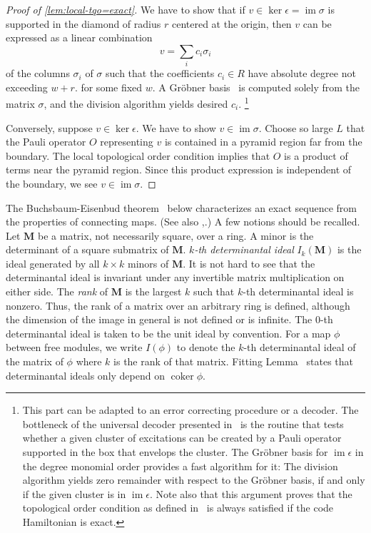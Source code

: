 \documentclass[letterpaper,12pt]{amsart}
\theoremstyle{definition} \newtheorem{defn}{Definition}
\theoremstyle{definition} \newtheorem{rem}{Remark}
\theoremstyle{definition} \newtheorem{example}{Example}
\newcommand{\im}{\mathop{\mathrm{im}}}
\newcommand{\coker}{\mathop{\mathrm{coker}}}
\begin{document}
\begin{proof}[Proof of \ref{lem:local-tqo=exact}]
We have to show that 
if $v \in \ker \epsilon = \im \sigma$ is supported in the diamond of radius $r$ centered at the origin,
then $v$ can be expressed as a linear combination
\[
 v = \sum_i c_i \sigma_i
\]
of the columns $\sigma_i$ of $\sigma$ 
such that the coefficients $c_i \in R$ have absolute degree not exceeding $w+r$.
for some fixed $w$.
A Gr\"obner basis~\cite{PauerUnterkircher1999} is computed solely from the matrix $\sigma$,
and the division algorithm yields desired $c_i$.%
\footnote{{This part can be adapted to an error correcting procedure or a decoder.
The bottleneck of the universal decoder presented in~\cite{BravyiHaah2011Memory}
is the routine that tests 
whether a given cluster of excitations can be created by a Pauli operator 
supported in the box that envelops the cluster.
The Gr{\"o}bner basis for $\im \epsilon$ in the degree monomial order
provides a fast algorithm for it: 
The division algorithm yields zero remainder with respect to the Gr\"obner basis,
if and only if
the given cluster is in $\im \epsilon$.
Note also that this argument proves that 
the topological order condition as defined in~\cite{BravyiHaah2011Memory} is always satisfied
if the code Hamiltonian is exact.
}}

Conversely,
suppose $v \in \ker \epsilon$. We have to show $v \in \im \sigma$.
Choose so large $L$ that the Pauli operator $O$ representing $v$ is contained
in a pyramid region far from the boundary.
The local topological order condition implies
that $O$ is a product of terms near the pyramid region.
Since this product expression is independent of the boundary,
we see $v \in \im \sigma$.
\end{proof}


The Buchsbaum-Eisenbud theorem~\cite{BuchsbaumEisenbud1973Exact}
below characterizes an exact sequence
from the properties of connecting maps.
(See also \cite[Theorem~20.9, Proposition~18.2]{Eisenbud},\cite[Chapter~6 Theorem~15]{Northcott}.)
A few notions should be recalled.
Let $\mathbf M$ be a matrix, not necessarily square, over a ring.
A minor is the determinant of a square submatrix of $\mathbf M$.
{\em $k$-th determinantal ideal} $I_k(\mathbf M)$ is the ideal generated by all $k \times k$ minors of $\mathbf M$.
It is not hard to see that the determinantal ideal is invariant under any invertible
matrix multiplication on either side. 
The {\em rank} of $\mathbf M$ is the largest $k$ such that $k$-th determinantal ideal is nonzero.
Thus, the rank of a matrix over an arbitrary ring is defined,
although the dimension of the image in general is not defined or is infinite.
The $0$-th determinantal ideal is taken to be the unit ideal by convention.
For a map $\phi$ between free modules,
we write $I(\phi)$ to denote the $k$-th determinantal
ideal of the matrix of $\phi$ where $k$ is the rank of that matrix.
Fitting Lemma~\cite[Corollary-Definition~20.4]{Eisenbud}
states that determinantal ideals only depend on $\coker \phi$.
\end{document}
